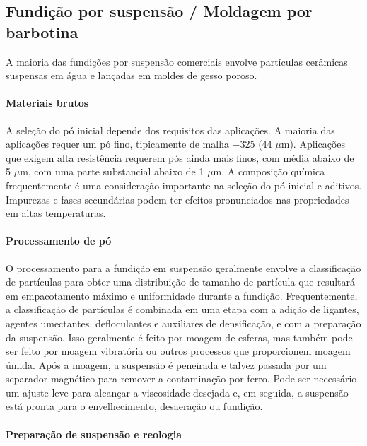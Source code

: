 \subsection*{Fundição por suspensão / Moldagem por barbotina}

A maioria das fundições por suspensão comerciais envolve partículas cerâmicas suspensas em água e lançadas em moldes de gesso poroso.

\paragraph*{Materiais brutos}

A seleção do pó inicial depende dos requisitos das aplicações. A maioria das aplicações requer um pó fino, tipicamente de malha $-$325 (44 $\mu$m). Aplicações que exigem alta resistência requerem pós ainda mais finos, com média abaixo de 5 $\mu$m, com uma parte substancial abaixo de 1 $\mu$m. A composição química frequentemente é uma consideração importante na seleção do pó inicial e aditivos. Impurezas e fases secundárias podem ter efeitos pronunciados nas propriedades em altas temperaturas.

\paragraph*{Processamento de pó}

O processamento para a fundição em suspensão geralmente envolve a classificação de partículas para obter uma distribuição de tamanho de partícula que resultará em empacotamento máximo e uniformidade durante a fundição. Frequentemente, a classificação de partículas é combinada em uma etapa com a adição de ligantes, agentes umectantes, defloculantes e auxiliares de densificação, e com a preparação da suspensão. Isso geralmente é feito por moagem de esferas, mas também pode ser feito por moagem vibratória ou outros processos que proporcionem moagem úmida. Após a moagem, a suspensão é peneirada e talvez passada por um separador magnético para remover a contaminação por ferro. Pode ser necessário um ajuste leve para alcançar a viscosidade desejada e, em seguida, a suspensão está pronta para o envelhecimento, desaeração ou fundição.

\paragraph*{Preparação de suspensão e reologia}

